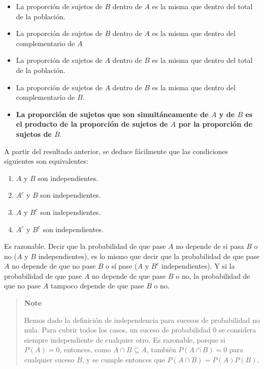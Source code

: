 \documentclass[
  spanish,
  letterpaper,
  DIV=11,
  numbers=noendperiod]{scrreprt}
\providecommand{\tightlist}{%
  \setlength{\itemsep}{0pt}\setlength{\parskip}{0pt}}
\begin{document}
\begin{tcolorbox}
\begin{itemize}
\item
  La proporción de sujetos de \(B\) dentro de \(A\) es la misma que
  dentro del total de la población.
\item
  La proporción de sujetos de \(B\) dentro de \(A\) es la misma que
  dentro del complementario de \(A\)
\item
  La proporción de sujetos de \(A\) dentro de \(B\) es la misma que
  dentro del total de la población.
\item
  La proporción de sujetos de \(A\) dentro de \(B\) es la misma que
  dentro del complementario de \(B\).
\item
  \textbf{La proporción de sujetos que son simultáneamente de \(A\) y de
  \(B\) es el producto de la proporción de sujetos de \(A\) por la
  proporción de sujetos de \(B\)}.
\end{itemize}

A partir del resultado anterior, se deduce fácilmente que las
condiciones siguientes son equivalentes:

\begin{enumerate}
\def\labelenumi{\arabic{enumi}.}
\tightlist
\item
  \(A\) y \(B\) son independientes.
\item
  \(A^c\) y \(B\) son independientes.
\item
  \(A\) y \(B^c\) son independientes.
\item
  \(A^c\) y \(B^c\) son independientes.
\end{enumerate}

Es razonable. Decir que la probabilidad de que pase \(A\) no depende de
si pasa \(B\) o no (\(A\) y \(B\) independientes), es lo mismo que decir
que la probabilidad de que pase \(A\) no depende de que no pase \(B\) o
sí pase (\(A\) y \(B^c\) independientes). Y si la probabilidad de que
pase \(A\) no depende de que pase \(B\) o no, la probabilidad de que no
pase \(A\) tampoco depende de que pase \(B\) o no.

\begin{quote}
\textbf{Note}

Hemos dado la definición de independencia para sucesos de probabilidad
no nula. Para cubrir todos los casos, un suceso de probabilidad 0 se
considera siempre independiente de cualquier otro. Es razonable, porque
si \(P(A)=0\), entonces, como \(A\cap B\subseteq A\), también
\(P(A\cap B)=0\) para cualquier suceso \(B\), y se cumple entonces que
\(P(A\cap B)=P(A)P(B)\).
\end{quote}


\end{tcolorbox}
\end{document}
